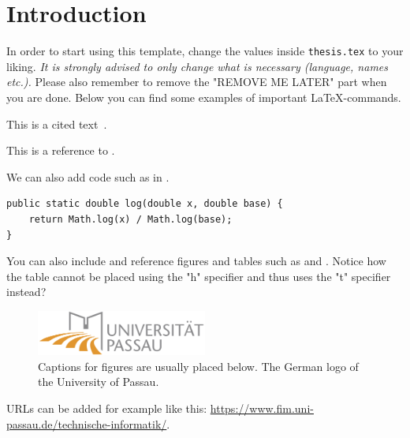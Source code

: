 

\chapter{Introduction}
\label{chapter:introduction}

In order to start using this template, change the values inside \texttt{thesis.tex} to your liking. \emph{It is strongly advised to only change what is necessary (language, names etc.).} Please also remember to remove the "REMOVE ME LATER" part when you are done. Below you can find some examples of important \LaTeX-commands.

This is a cited text~\cite{taubmann2016CloudPhylactor}.


This is a reference to .

We can also add code such as in .

\begin{code}
    \label{lst:log}
    \begin{verbatim}
public static double log(double x, double base) {
    return Math.log(x) / Math.log(base);
}
    \end{verbatim}
\end{code}

You can also include and reference figures and tables such as  and . Notice how the table cannot be placed using the "h" specifier and thus uses the "t" specifier instead?

\begin{figure}[ht!]
    \centering
    \includegraphics[width=0.5\textwidth]{img/logouni.png}
    \caption{Captions for figures are usually placed below. The German logo of the University of Passau.}
    \label{fig:test}
\end{figure}

URLs can be added for example like this: \url{https://www.fim.uni-passau.de/technische-informatik/}.

